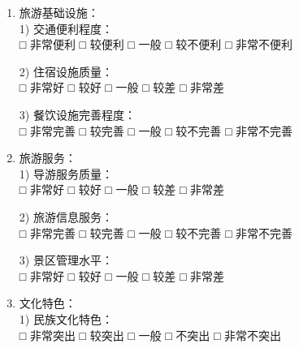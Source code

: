 \documentclass[10pt]{article}
\begin{document}
\begin{CJK*}{UTF8}{gbsn}
\begin{enumerate}[label=\arabic*., resume, itemsep=0.8cm]
\item 旅游基础设施：\\
1) 交通便利程度：\\
□ 非常便利 \hspace{1cm} □ 较便利 \hspace{1cm} □ 一般 \hspace{1cm} □ 较不便利 \hspace{1cm} □ 非常不便利

2) 住宿设施质量：\\
□ 非常好 \hspace{1cm} □ 较好 \hspace{1cm} □ 一般 \hspace{1cm} □ 较差 \hspace{1cm} □ 非常差

3) 餐饮设施完善程度：\\
□ 非常完善 \hspace{1cm} □ 较完善 \hspace{1cm} □ 一般 \hspace{1cm} □ 较不完善 \hspace{1cm} □ 非常不完善

\item 旅游服务：\\
1) 导游服务质量：\\
□ 非常好 \hspace{1cm} □ 较好 \hspace{1cm} □ 一般 \hspace{1cm} □ 较差 \hspace{1cm} □ 非常差

2) 旅游信息服务：\\
□ 非常完善 \hspace{1cm} □ 较完善 \hspace{1cm} □ 一般 \hspace{1cm} □ 较不完善 \hspace{1cm} □ 非常不完善

3) 景区管理水平：\\
□ 非常好 \hspace{1cm} □ 较好 \hspace{1cm} □ 一般 \hspace{1cm} □ 较差 \hspace{1cm} □ 非常差

\item 文化特色：\\
1) 民族文化特色：\\
□ 非常突出 \hspace{1cm} □ 较突出 \hspace{1cm} □ 一般 \hspace{1cm} □ 不突出 \hspace{1cm} □ 非常不突出


\end{enumerate}
\end{CJK*}
\end{document}
